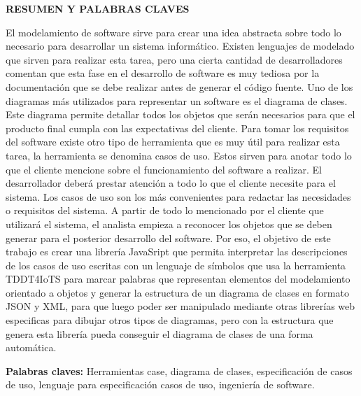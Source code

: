 \begin{center}
	{\titulodc \textbf{RESUMEN Y PALABRAS CLAVES}}
\end{center}

El modelamiento de software sirve para crear una idea abstracta sobre todo lo necesario para desarrollar un sistema informático. Existen lenguajes de modelado que sirven para realizar esta tarea, pero una cierta cantidad de desarrolladores comentan que esta fase en el desarrollo de software es muy tediosa por la documentación que se debe realizar antes de generar el código fuente. Uno de los diagramas más utilizados para representar un software es el diagrama de clases. Este diagrama permite detallar todos los objetos que serán necesarios para que el producto final cumpla con las expectativas del cliente. Para tomar los requisitos del software existe otro tipo de herramienta que es muy útil para realizar esta tarea, la herramienta se denomina casos de uso. Estos sirven para anotar todo lo que el cliente mencione sobre el funcionamiento del software a realizar. El desarrollador deberá prestar atención a todo lo que el cliente necesite para el sistema. Los casos de uso son los más convenientes para redactar las necesidades o requisitos del sistema. A partir de todo lo mencionado por el cliente que utilizará el sistema, el analista empieza a reconocer los objetos que se deben generar para el posterior desarrollo del software. Por eso, el objetivo de este trabajo es crear una librería JavaSript que permita interpretar las descripciones de los casos de uso escritas con un lenguaje de símbolos que usa la herramienta TDDT4IoTS para marcar palabras que representan elementos del modelamiento orientado a objetos y generar la estructura de un diagrama de clases en formato JSON y XML, para que luego poder ser manipulado mediante otras librerías web especificas para dibujar otros tipos de diagramas, pero con la estructura que genera esta librería pueda conseguir el diagrama de clases de una forma automática. 

\textbf{Palabras claves:} Herramientas case, diagrama de clases, especificación de casos de uso, lenguaje para especificación casos de uso, ingeniería de software.
